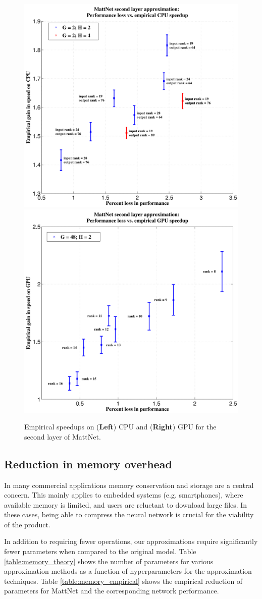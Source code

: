 \begin{figure}[t]
\centering
\begin{minipage}{0.75\textwidth}
      \includegraphics[width=0.5\linewidth]{img/layer2_CPUspeedup_vs_performance_loss.pdf}
      \quad\quad
      \includegraphics[width=0.5\linewidth]{img/layer2_GPUspeedup_vs_performance_loss.pdf}
\end{minipage}
\caption{Empirical speedups on ({\bf Left}) CPU and ({\bf Right}) GPU for the second layer of MattNet.}
\label{fig:biclust_speedups}
\end{figure}


\subsection{Reduction in memory overhead}
In many commercial applications memory conservation and storage are a
central concern. This mainly applies to embedded systems
(e.g. smartphones), where available memory is limited, and users are
reluctant to download large files. In these cases, being able to
compress the neural network is crucial for the viability of the
product. 

In addition to requiring fewer operations, our approximations
require significantly fewer parameters when compared to the original
model. Table \ref{table:memory_theory} shows the number of parameters for
various approximation methods as a function of hyperparameters for the approximation techniques. Table \ref{table:memory_empirical} shows the empirical reduction of parameters for MattNet and the corresponding network performance.

